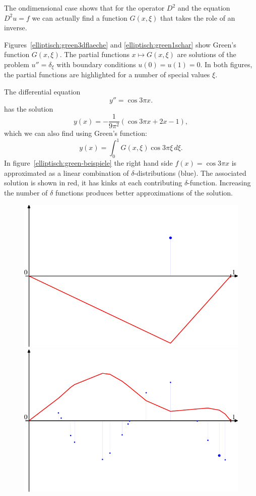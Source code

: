 The ondimensional case shows that for the operator  $D^2$ and the
equation $D^2u=f$
we can actually find a function $G(x,\xi)$ that takes the role 
of an inverse.

Figures~\ref{elliptisch:green3dflaeche} and \ref{elliptisch:green1schar}
show Green's function $G(x,\xi)$.
The partial functions 
$x\mapsto G(x,\xi)$ are solutions of the problem
$u''=\delta_\xi$ with boundary conditions $u(0)=u(1)=0$.
In both figures, the partial functions are highlighted for 
a number of special values $\xi$.

\begin{beispiel}
The differential equation
\[
y''=\cos 3\pi x.
\]
has the solution
\[
y(x)=-\frac1{9\pi^2}(\cos 3\pi x + 2x - 1),
\]
which we can also find using Green's function:
\[
y(x)=\int_0^1 G(x,\xi)\cos 3\pi\xi\,d\xi.
\]
In figure~\ref{elliptisch:green-beispiele}
the right hand side $f(x)=\cos 3\pi x$ is approximated as a linear
combination of $\delta$-distributions (blue).
The associated solution is shown in red, it has kinks at each 
contributing $\delta$-function.
Increasing the number of $\delta$ functions produces better approximations
of the solution.
\begin{figure}
\begin{center}
\includegraphics[width=0.7\hsize]{../common/graphics/green-1.pdf}\\
\includegraphics[width=0.7\hsize]{../common/graphics/green-324.pdf}\\

\end{center}
\end{figure}
\end{beispiel}
